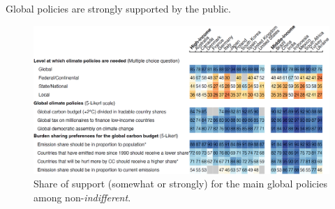 \documentclass[aspectratio=169,xcolor=dvipsnames, 11pt,mathserif]{beamer}
\begin{document}
\begin{frame}{Global policies are strongly supported by the public.\label{global_policies}}
	\vspace{-.3cm}
	\begin{figure}[h!]
		\centering		
		\caption{Share of support (somewhat or strongly) for the main global policies among non-\textit{indifferent}.  \hyperlink{national_policies}{} \hyperlink{national_policies}{}%
        }
        \vspace{-.2cm}
		\includegraphics[height=.9\textheight]{../figures/OECD/Heatplot_global_tax_attitudes_share_wo_TD.png} %
		\end{figure}
\end{frame}
\end{document}
